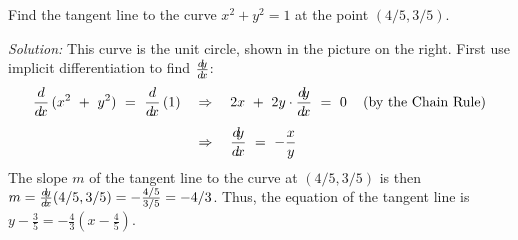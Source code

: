 \newpage
\begin{exmp}\label{exmp:implicitcir}
\noindent Find the tangent line to the curve $x^2 + y^2 = 1$ at the point
$(4/5,3/5)$.\vspace{1mm}
\par\noindent\emph{Solution:} This curve is the unit circle, shown in the
picture on the right. First use implicit differentiation to find $\frac{d\negmedspace y}{d\!x}$:
\begin{align*}
\frac{d}{d\!x}\,(x^2 ~+~ y^2) ~=~ \frac{d}{d\!x}\,(1) \quad&\Rightarrow\quad
2x ~+~ 2y \cdot \frac{d\negmedspace y}{d\!x} ~=~ 0 \quad\left(\text{by the Chain Rule}\right)\\[4pt]
&\Rightarrow\quad \frac{d\negmedspace y}{d\!x} ~=~ -\frac{x}{y}
\end{align*}\vspace{-7mm}
\noindent The slope $m$ of the tangent line to the curve at $(4/5,3/5)$ is then
$m = \frac{d\negmedspace y}{d\!x}(4/5,3/5) = -\frac{4/5}{3/5} = -4/3$. Thus, the equation of the
tangent line is $y - \frac{3}{5} = -\frac{4}{3}\left(x - \frac{4}{5}\right)$.
\end{exmp}\vspace{-2mm}
\divider
\vspace{3mm}

